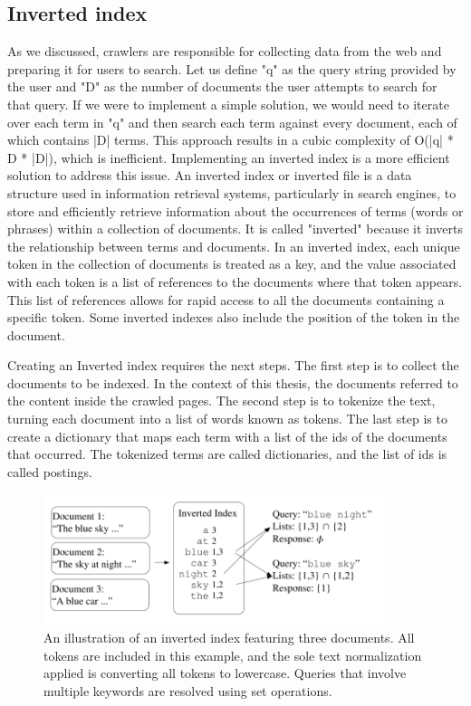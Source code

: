 \subsection*{Inverted index}
As we discussed, crawlers are responsible for collecting data from the web and preparing it for users to search. Let us define "q" as the query string provided by the user and "D" as the number of documents the user attempts to search for that query. If we were to implement a simple solution, we would need to iterate over each term in "q" and then search each term against every document, each of which contains |D| terms. This approach results in a cubic complexity of O(|q| * D * |D|), which is inefficient. Implementing an inverted index is a more efficient solution to address this issue. An inverted index or inverted file is a data structure used in information retrieval systems, particularly in search engines, to store and efficiently retrieve information about the occurrences of terms (words or phrases) within a collection of documents. It is called "inverted" because it inverts the relationship between terms and documents.
In an inverted index, each unique token in the collection of documents is treated as a key, and the value associated with each token is a list of references to the documents where that token appears. This list of references allows for rapid access to all the documents containing a specific token. Some inverted indexes also include the position of the token in the document. 

Creating an Inverted index requires the next steps. The first step is to collect the documents to be indexed. In the context of this thesis, the documents referred to the content inside the crawled pages. The second step is to tokenize the text, turning each document into a list of words known as tokens. The last step is to create a dictionary that maps each term with a list of the ids of the documents that occurred. The tokenized terms are called dictionaries, and the list of ids is called postings. 

\begin{figure}[h]	
     \centering
     \includegraphics[width=10cm]{figures/inverted_index.png}
     \caption{
An illustration of an inverted index featuring three documents. All tokens are included in this example, and the sole text normalization applied is converting all tokens to lowercase. Queries that involve multiple keywords are resolved using set operations. \cite{castillo2005effective}}
     \label{fig:inverted-index-docs}
\end{figure}

